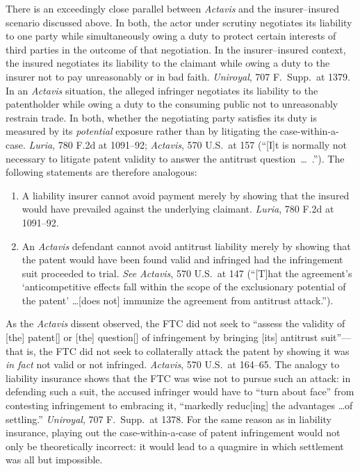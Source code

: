 \documentclass[
  12pt,
  letterpaper,
]{scrartcl}
\begin{document}
There is an exceedingly close parallel between \textit{Actavis} and the
insurer--insured scenario discussed above. In both, the actor under scrutiny
negotiates its liability to one party while simultaneously owing a duty to
protect certain interests of third parties in the outcome of that negotiation.
In the insurer--insured context, the insured negotiates its liability to the
claimant while owing a duty to the insurer not to pay unreasonably or in bad
faith. \textit{Uniroyal}, 707 F.~Supp.~at 1379. In an \emph{Actavis} situation,
the alleged infringer negotiates its liability to the patentholder while owing
a duty to the consuming public not to unreasonably restrain trade. In both,
whether the negotiating party satisfies its duty is measured by its
\emph{potential} exposure rather than by litigating the case-within-a-case.
\textit{Luria}, 780 F.2d at 1091--92; \textit{Actavis}, 570 U.S.~at 157 (``[I]t
is normally not necessary to litigate patent validity to answer the antitrust
question~\ldots~.''). The following statements are therefore analogous:

{\vspace{5pt}%
\begin{enumerate}
  \item A liability insurer cannot avoid payment merely by showing that the
    insured would have prevailed against the underlying claimant.
    \textit{Luria}, 780 F.2d at 1091--92.
  \item An \textit{Actavis} defendant cannot avoid antitrust liability merely
    by showing that the patent would have been found valid and infringed had the 
    infringement suit proceeded to trial. \textit{See}
    \textit{Actavis}, 570 U.S.~at 147 (``[T]hat the agreement's
    `anticompetitive effects fall within the scope of the exclusionary
    potential of the patent' \ldots [does not] immunize the agreement from
    antitrust attack.'').
\end{enumerate}%
}\vspace{-12pt}%

As the \textit{Actavis} dissent observed, the FTC did not seek to ``assess the
validity of [the] patent[] or [the] question[] of infringement by bringing
[its] antitrust suit''---that is, the FTC did not seek to collaterally attack
the patent by showing it was \textit{in fact} not valid or not infringed.
\textit{Actavis}, 570 U.S.~at 164--65. The analogy to liability insurance shows
that the FTC was wise not to pursue such an attack: in defending such a suit,
the accused infringer would have to ``turn about face'' from contesting
infringement to embracing it, ``markedly reduc[ing] the advantages \ldots of
settling.'' \textit{Uniroyal}, 707 F.~Supp.~at 1378. For the same reason as in
liability insurance, playing out the case-within-a-case of patent
infringement would not only be theoretically incorrect: it would lead to a
quagmire in which settlement was all but impossible.
\end{document}
